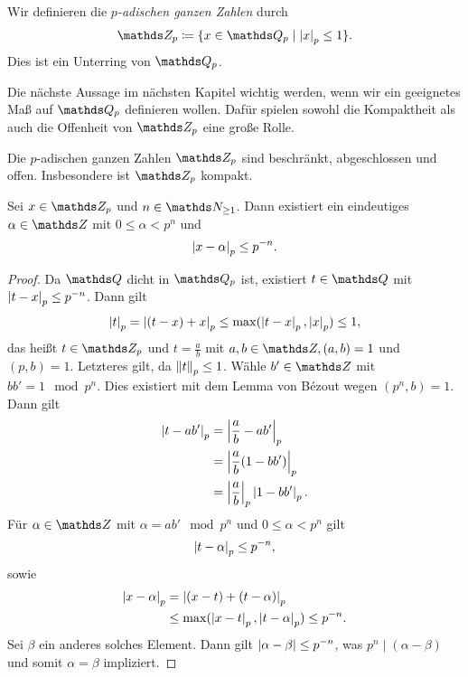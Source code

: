 \begin{defi}
Wir definieren die \emph{$p$-adischen ganzen Zahlen} durch
\begin{align*}
\Z_p\coloneqq \{x\in \Q_p \mid \abs{x}_p \leq 1\}.
\end{align*}
Dies ist ein Unterring von $\Q_p$.
\end{defi}

Die nächste Aussage im nächsten Kapitel wichtig werden, wenn wir ein geeignetes Maß auf $\Q_p$ definieren wollen.
Dafür spielen sowohl die Kompaktheit als auch die Offenheit von $\Z_p$ eine große Rolle.

\begin{satz}
Die $p$-adischen ganzen Zahlen $\Z_p$ sind beschränkt, abgeschlossen und offen.
Insbesondere ist $\Z_p$ kompakt.
\end{satz}

\begin{satz}
Sei $x\in \Z_p$ und $n\in \N_{\geq 1}$.
Dann existiert ein eindeutiges $\alpha \in \Z$ mit $0\leq \alpha <p^n$ und
\begin{align*}
\left\vert x-\alpha\right\vert_p\leq p^{-n}.
\end{align*}
\begin{proof}
Da $\Q$ dicht in $\Q_p$ ist, existiert $t \in \Q$ mit $\left\vert t-x\right\vert_p \leq p^{-n}$.
Dann gilt
\begin{align*}
\left\vert t\right\vert_p=\left\vert(t-x)+x\right\vert_p \leq \max(\left\vert t-x\right\vert_p,\left\vert x\right\vert_p) \leq 1,
\end{align*}
das heißt $t \in \Z_p$ und $t=\frac{a}{b}$ mit $a,b\in \Z, (a,b)=1$ und $(p,b)=1$. Letzteres gilt, da $\left\lVert t\right\rVert_p\leq 1$. 
Wähle $b'\in \Z$ mit $bb'=1 \mod p^n$. Dies existiert mit dem Lemma von Bézout wegen $(p^n,b)=1$.
Dann gilt
\begin{align*}
\left\vert t-ab'\right\vert_p&=\left\vert\frac{a}{b}-ab'\right\vert_p\\
&=\left\vert\frac{a}{b}(1-bb')\right\vert_p\\
&=\left\vert\frac{a}{b}\right\vert_p \left\vert1-bb'\right\vert_p.
\end{align*}
Für $\alpha \in \Z$ mit $\alpha=ab' \mod p^n$ und $0 \leq \alpha <p^n$ gilt
\begin{align*}
\left\vert t-\alpha\right\vert_p\leq p^{-n},
\end{align*}
sowie
\begin{align*}
\left\vert x-\alpha\right\vert_p &=\left\vert(x-t)+(t-\alpha)\right\vert_p\\
&\leq \max (\left\vert x-t\right\vert_p,\left\vert t-\alpha\right\vert_p)\leq p^{-n}.
\end{align*}
Sei $\beta$ ein anderes solches Element. Dann gilt $\left\vert\alpha-\beta\right\vert\leq p^{-n}$, was $p^n\mid (\alpha-\beta)$ und somit $\alpha=\beta$ impliziert.
\end{proof}
\end{satz}

